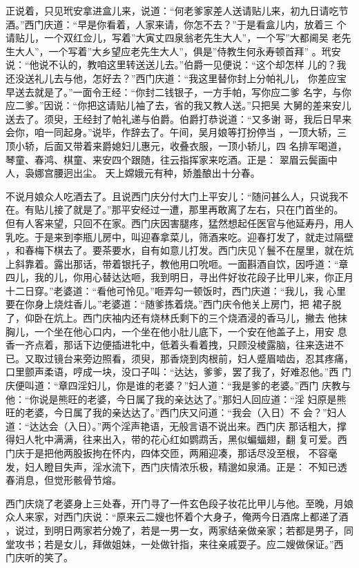 正说着，只见玳安拿进盒儿来，说道：“何老爹家差人送请贴儿来，初九日请吃节
酒。”西门庆道：“早是你看着，人家来请，你怎不去？”于是看盒儿内，放着三
个请贴儿，一个双红佥儿，写着”大寅丈四泉翁老先生大人”，一个写”大都阃吴
老先生大人”，一个写着”大乡望应老先生大人”，俱是”侍教生何永寿顿首拜”
。玳安说：“他说不认的，教咱这里转送送儿去。”伯爵一见便说：“这个却怎样
儿的？我还没送礼儿去与他，怎好去？”西门庆道：“我这里替你封上分帕礼儿，
你差应宝早送去就是了。”一面令王经：“你封二钱银子，一方手帕，写你应二爹
名字，与你应二爹。”因说：“你把这请贴儿袖了去，省的我又教人送。”只把吴
大舅的差来安儿送去了。须臾，王经封了帕礼递与伯爵。伯爵打恭说道：“又多谢
哥，我后日早来会你，咱一同起身。”说毕，作辞去了。午间，吴月娘等打扮停当
，一顶大轿，三顶小轿，后面又带着来爵媳妇儿惠元，收叠衣服，一顶小轿儿，四
名排军喝道，琴童、春鸿、棋童、来安四个跟随，往云指挥家来吃酒。正是：
翠眉云鬓画中人，袅娜宫腰迥出尘。
天上嫦娥元有种，娇羞酿出十分春。

不说月娘众人吃酒去了。且说西门庆分付大门上平安儿：“随问甚么人，只说我不
在。有贴儿接了就是了。”那平安经过一遭，那里再敢离了左右，只在门首坐的。
但有人客来望，只回不在家。西门庆因害腿疼，猛然想起任医官与他延寿丹，用人
乳吃。于是来到李瓶儿房中，叫迎春拿菜儿，筛酒来吃。迎春打发了，就走过隔壁
，和春梅下棋去了。要茶要水，自有如意儿打发。西门庆见丫鬟不在屋里，就在炕
上斜靠着。露出那话，带着银托子，教他用口吮咂。一面斟酒自饮，因呼道：“章
四儿，我的儿，你用心替达达咂，我到明日，寻出件好妆花段子比甲儿来，你正月
十二日穿。”老婆道：“看他可怜见。”咂弄勾一顿饭时，西门庆道：“我儿，我
心里要在你身上烧炷香儿。”老婆道：“随爹拣着烧。”西门庆令他关上房门，把
裙子脱了，仰卧在炕上。西门庆袖内还有烧林氏剩下的三个烧酒浸的香马儿，撇去
他抹胸儿，一个坐在他心口内，一个坐在他小肚儿底下，一个安在他盖子上，用安
息香一齐点着，那话下边便插进牝中，低着头看着拽，只顾没棱露脑，往来迭进不
已。又取过镜台来旁边照看，须臾，那香烧到肉根前，妇人蹙眉啮齿，忍其疼痛，
口里颤声柔语，哼成一块，没口子叫：“达达，爹爹，罢了我了，好难忍他。”西
门庆便叫道：“章四淫妇儿，你是谁的老婆？”妇人道：“我是爹的老婆。”西门
庆教与他：“你说是熊旺的老婆，今日属了我的亲达达了。”那妇人回应道：“淫
妇原是熊旺的老婆，今日属了我的亲达达了。”西门庆又问道：“我会（入日）不
会？”妇人道：“达达会（入日）。”两个淫声艳语，无般言语不说出来。西门庆
那话粗大，撑得妇人牝中满满，往来出入，带的花心红如鹦鹉舌，黑似蝙蝠翅，翻
复可爱。西门庆于是把他两股扳拘在怀内，四体交匝，两厢迎凑，那话尽没至根，
不容毫发，妇人瞪目失声，淫水流下，西门庆情浓乐极，精邈如泉涌。正是：
不知已透春消息，但觉形骸骨节熔。

西门庆烧了老婆身上三处春，开门寻了一件玄色段子妆花比甲儿与他。至晚，月娘
众人来家，对西门庆说：“原来云二嫂也怀着个大身子，俺两今日酒席上都递了酒
，说过，到明日两家若分娩了，若是一男一女，两家结亲做亲家；若都是男子，同
堂攻书；若是女儿，拜做姐妹，一处做针指，来往亲戚耍子。应二嫂做保证。”西
门庆听的笑了。

